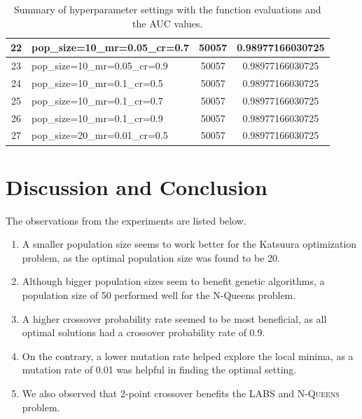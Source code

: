 \documentclass{article}
\begin{document}
\begin{table}[h!]
\begin{tabular}{|c|l|c|c|}
22 & pop\_size=10\_mr=0.05\_cr=0.7 & 50057 & 0.98977166030725 \\ \hline
23 & pop\_size=10\_mr=0.05\_cr=0.9 & 50057 & 0.98977166030725 \\ \hline
24 & pop\_size=10\_mr=0.1\_cr=0.5  & 50057 & 0.98977166030725 \\ \hline
25 & pop\_size=10\_mr=0.1\_cr=0.7  & 50057 & 0.98977166030725 \\ \hline
26 & pop\_size=10\_mr=0.1\_cr=0.9  & 50057 & 0.98977166030725 \\ \hline
27 & pop\_size=20\_mr=0.01\_cr=0.5 & 50057 & 0.98977166030725 \\ \hline
\end{tabular}
\caption{Summary of hyperparameter settings with the function evaluations and the AUC values.}
\label{tab:AUC-Katsuura}
\end{table}
\clearpage

\section{Discussion and Conclusion}\label{sec:dis&res}
The observations from the experiments are listed below. 
\begin{enumerate}
    \item A smaller population size seems to work better for the Katsuura optimization problem, as the optimal population size was found to be 20.
    \item Although bigger population sizes seem to benefit genetic algorithms, a population size of 50 performed well for the N-Queens problem. 
    \item A higher crossover probability rate seemed to be most beneficial, as all optimal solutions had a crossover probability rate of 0.9.
    \item On the contrary, a lower mutation rate helped explore the local minima, as a mutation rate of 0.01 was helpful in finding the optimal setting. 
    \item We also observed that 2-point crossover benefits the \textsc{LABS} and \textsc{N-Queens} problem. 
\end{enumerate}


    
\end{document}

